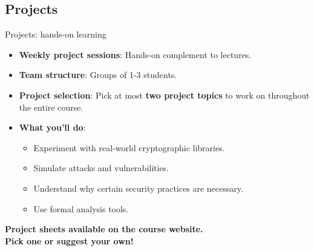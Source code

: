 \documentclass[aspectratio=169, lualatex, handout]{beamer}
\begin{document}
\subsection{Projects}

\begin{frame}{Projects: hands-on learning}
	\begin{itemize}[<+->]
		\item \textbf{Weekly project sessions}: Hands-on complement to lectures.
		\item \textbf{Team structure}: Groups of 1-3 students.
		\item \textbf{Project selection}: Pick at most \textbf{two project topics} to work on throughout the entire course.
		\item \textbf{What you'll do}:
		      \begin{itemize}
			      \item Experiment with real-world cryptographic libraries.
			      \item Simulate attacks and vulnerabilities.
			      \item Understand why certain security practices are necessary.
			      \item Use formal analysis tools.
		      \end{itemize}
	\end{itemize}
	\vspace{0.1cm}
	\begin{center}
		\Large\textcolor{cipherprimary}{\textbf{Project sheets available on the course website. \\ Pick one or suggest your own!}}
	\end{center}
\end{frame}
\end{document}
